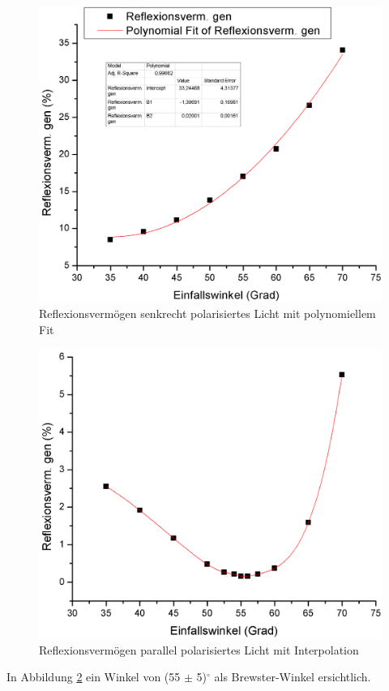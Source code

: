 \documentclass[12pt,a4paper]{article}
\begin{document}
\begin{multicols}{2}
\begin{figure}[H]
	\centering
	\includegraphics[scale=0.28]{./data/R_S_Plot.png}
	\caption{Reflexionsvermögen senkrecht polarisiertes Licht mit polynomiellem Fit}
	\label{fig:r_s_plot}
\end{figure}

\begin{figure}[H]
	\centering
	\includegraphics[scale=0.28]{./data/R_P_Plot.png}
	\caption{Reflexionsvermögen parallel polarisiertes Licht mit Interpolation}
	\label{fig:r_p_plot}
\end{figure}
In Abbildung \ref{fig:r_p_plot} ein Winkel von (55 $\pm$ 5)$^\circ$ als Brewster-Winkel ersichtlich.

\end{multicols}
\end{document}
